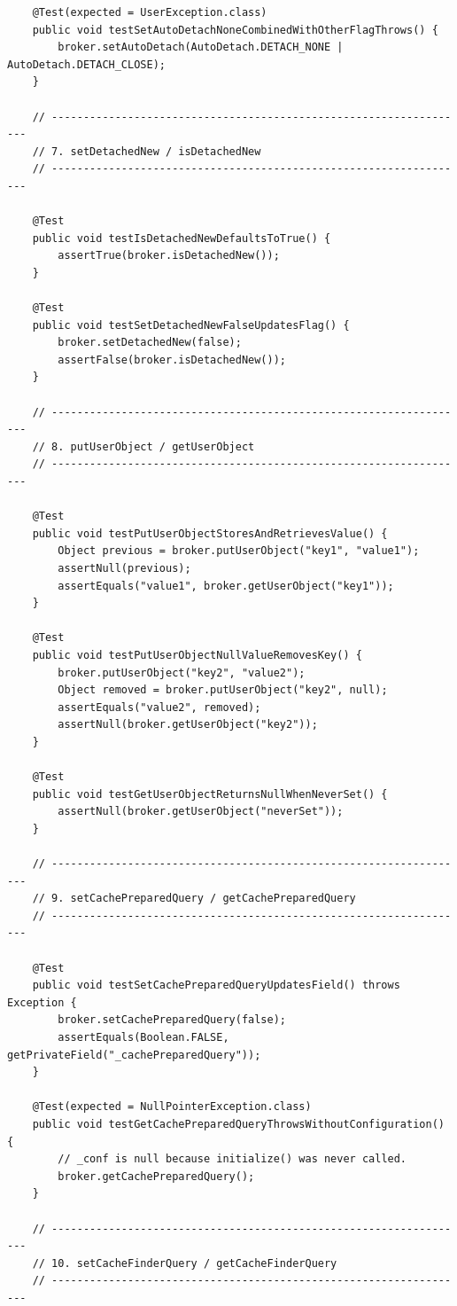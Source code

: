 \begin{lstlisting}
    @Test(expected = UserException.class)
    public void testSetAutoDetachNoneCombinedWithOtherFlagThrows() {
        broker.setAutoDetach(AutoDetach.DETACH_NONE | AutoDetach.DETACH_CLOSE);
    }

    // ------------------------------------------------------------------
    // 7. setDetachedNew / isDetachedNew
    // ------------------------------------------------------------------

    @Test
    public void testIsDetachedNewDefaultsToTrue() {
        assertTrue(broker.isDetachedNew());
    }

    @Test
    public void testSetDetachedNewFalseUpdatesFlag() {
        broker.setDetachedNew(false);
        assertFalse(broker.isDetachedNew());
    }

    // ------------------------------------------------------------------
    // 8. putUserObject / getUserObject
    // ------------------------------------------------------------------

    @Test
    public void testPutUserObjectStoresAndRetrievesValue() {
        Object previous = broker.putUserObject("key1", "value1");
        assertNull(previous);
        assertEquals("value1", broker.getUserObject("key1"));
    }

    @Test
    public void testPutUserObjectNullValueRemovesKey() {
        broker.putUserObject("key2", "value2");
        Object removed = broker.putUserObject("key2", null);
        assertEquals("value2", removed);
        assertNull(broker.getUserObject("key2"));
    }

    @Test
    public void testGetUserObjectReturnsNullWhenNeverSet() {
        assertNull(broker.getUserObject("neverSet"));
    }

    // ------------------------------------------------------------------
    // 9. setCachePreparedQuery / getCachePreparedQuery
    // ------------------------------------------------------------------

    @Test
    public void testSetCachePreparedQueryUpdatesField() throws Exception {
        broker.setCachePreparedQuery(false);
        assertEquals(Boolean.FALSE, getPrivateField("_cachePreparedQuery"));
    }

    @Test(expected = NullPointerException.class)
    public void testGetCachePreparedQueryThrowsWithoutConfiguration() {
        // _conf is null because initialize() was never called.
        broker.getCachePreparedQuery();
    }

    // ------------------------------------------------------------------
    // 10. setCacheFinderQuery / getCacheFinderQuery
    // ------------------------------------------------------------------


\end{lstlisting}
